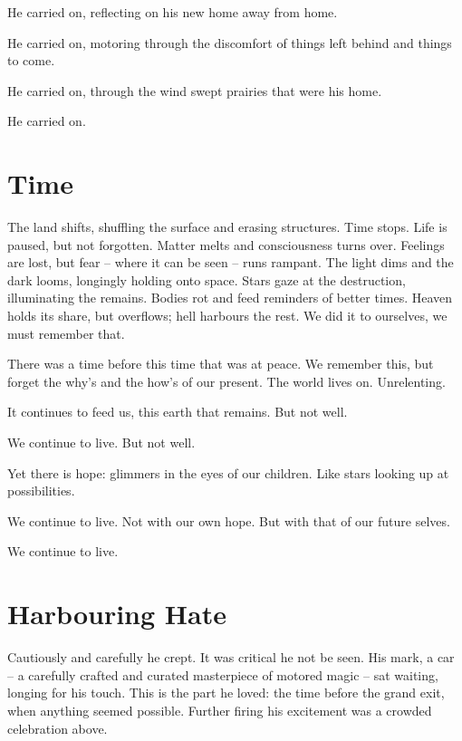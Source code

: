 \documentclass[fontsize=12pt,english]{article}
\begin{document}
He carried on, reflecting on his new home away from home.

He carried on, motoring through the discomfort of things left behind
and things to come.

He carried on, through the wind swept prairies that were his home.

He carried on.


\newpage

\section{Time}


The land shifts, shuffling the surface and erasing structures. Time
stops. Life is paused, but not forgotten. Matter melts and
consciousness turns over. Feelings are lost, but fear -- where it can
be seen -- runs rampant. The light dims and the dark looms, longingly
holding onto space. Stars gaze at the destruction, illuminating the
remains. Bodies rot and feed reminders of better times. Heaven holds
its share, but overflows; hell harbours the rest. We did it to
ourselves, we must remember that.

There was a time before this time that was at peace. We remember this,
but forget the why's and the how's of our present. The world lives
on. Unrelenting.

It continues to feed us, this earth that remains. But not well.

We continue to live. But not well.

Yet there is hope: glimmers in the eyes of our children. Like stars
looking up at possibilities.

We continue to live. Not with our own hope. But with that of our
future selves.

We continue to live.

\newpage

\section{Harbouring Hate}

Cautiously and carefully he crept. It was critical he not be seen. His
mark, a car -- a carefully crafted and curated masterpiece of motored
magic -- sat waiting, longing for his touch. This is the part he
loved: the time before the grand exit, when anything seemed
possible. Further firing his excitement was a crowded celebration
above.
\end{document}
